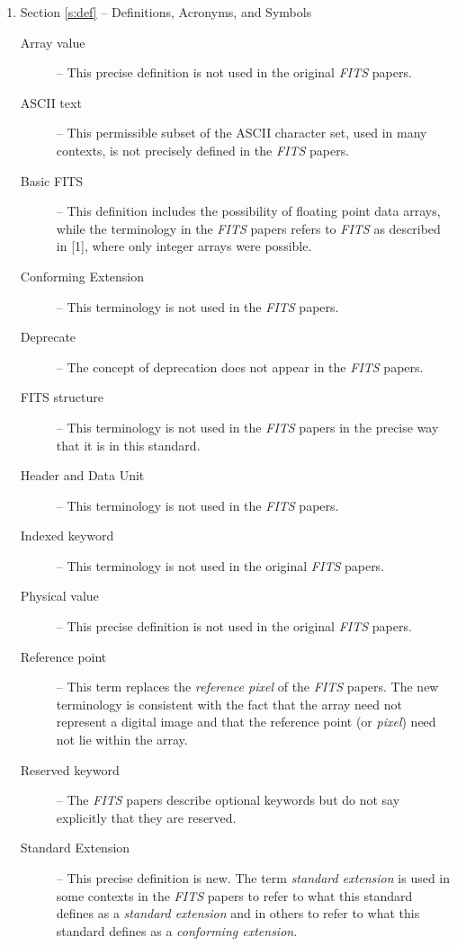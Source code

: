 \begin{enumerate}

\item Section \ref{s:def} -- Definitions, Acronyms, and Symbols

 \begin{description}

 \item[Array value] -- This precise definition 
     is not used in the original {\em FITS\/} papers.
 \item[ASCII text] -- This permissible subset 
     of the ASCII character set, used in many contexts, is not 
     precisely defined in the {\em FITS\/} papers.
 \item[Basic FITS] -- This definition 
   includes the possibility of floating point data arrays, 
   while the terminology in the {\em FITS\/} papers refers 
   to {\em FITS\/} as described in [1], where 
   only integer arrays were possible. 
 \item[Conforming Extension] -- This terminology is not used in 
     the 
     {\em FITS\/} papers.
 \item[Deprecate] -- The concept of deprecation does
      not appear in the {\em FITS\/} papers.
 \item[FITS structure] -- This terminology 
       is not used in the {\em FITS\/}
       papers in the precise way that it is in this standard.
 \item[Header and Data Unit] -- This terminology is not used in the 
     {\em FITS\/} papers.
 \item[Indexed keyword] -- This terminology is not
      used in the original {\em FITS\/} papers.
 \item[Physical value] -- This precise definition 
     is not used in the original {\em FITS\/} papers.
 \item[Reference point] -- This term replaces the {\em reference pixel} of 
     the
     {\em FITS\/} papers.  The new terminology is consistent 
     with the fact that 
     the array need not represent a digital image and that the reference 
     point (or {\em pixel}) need not lie within the array.
 \item[Reserved keyword] -- The {\em FITS\/} 
     papers 
     describe optional keywords but do not say 
     explicitly that they are reserved.
 \item[Standard Extension] -- This 
     precise definition is new.  The term
     {\em standard extension} is used in some contexts in the 
     {\em FITS\/} papers to refer to what this standard defines as a
     {\em standard extension} and in others to refer to what this 
     standard defines
     as a {\em conforming extension}.


\end{description}
\end{enumerate}
